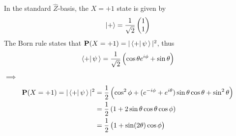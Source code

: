 \documentclass[11pt, answers]{exam}
\newcommand{\prob}{\textbf{P}}
\begin{document}
	\begin{solution}
		In the standard $\hat{Z}$-basis, the $X=+1$ state is given by
		\begin{align*}
			\ket{+} = \frac{1}{\sqrt{2}}
			\begin{pmatrix}
				1 \\
				1
			\end{pmatrix}
		\end{align*}
		The Born rule states that $\prob(X=+1)=|\braket{+|\,\psi\,}|^2$, thus
		\begin{align*}
			\braket{+|\,\psi\,} = \frac{1}{\sqrt{2}}\left(\cos\theta e^{i\phi} + \sin\theta\right)
		\end{align*}
		$\implies$
		\begin{align*}
			\prob(X=+1) = |\braket{+|\,\psi\,}|^2 &= \frac{1}{2}\left(\cos^2\phi+(e^{-i\phi}+e^{i\theta})\sin\theta\cos\theta + \sin^2\theta\right) \\
			&=\frac{1}{2}\left(1 + 2\sin\theta\cos\theta\cos\phi\right) \\
			&=\frac{1}{2}\left(1+\sin(2\theta)\cos\phi\right)
		\end{align*}
	\end{solution}
\end{document}
